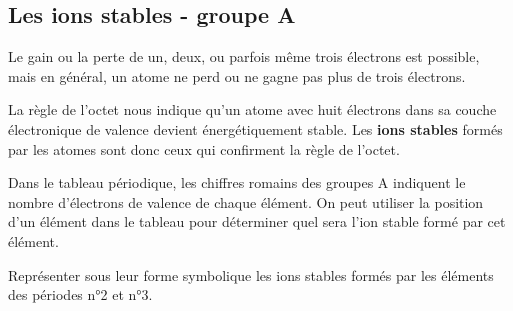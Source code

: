 \documentclass[
  11pt,
  french,
  a4paper,
  openany]{book}
\begin{document}
\hypertarget{les-ions-stables---groupe-a}{%
\subsection{Les ions stables - groupe A}\label{les-ions-stables---groupe-a}}

Le gain ou la perte de un, deux, ou parfois même trois électrons est possible, mais en général, un atome ne perd ou ne gagne pas plus de trois électrons.

La règle de l'octet nous indique qu'un atome avec huit électrons dans sa couche électronique de valence devient énergétiquement stable. Les \textbf{ions stables} formés par les atomes sont donc ceux qui confirment la règle de l'octet.

Dans le tableau périodique, les chiffres romains des groupes A indiquent le nombre d'électrons de valence de chaque élément. On peut utiliser la position d'un élément dans le tableau pour déterminer quel sera l'ion stable formé par cet élément.

\begin{Exercise}
Représenter sous leur forme symbolique les ions stables formés par les éléments des périodes n°2 et n°3.

\end{Exercise}
\end{document}
